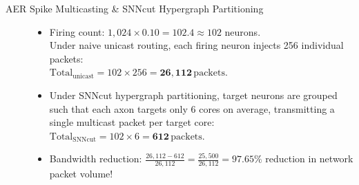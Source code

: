 \begin{description}
    \item[AER Spike Multicasting \& SNNcut Hypergraph Partitioning]
    \begin{itemize}
        \item Firing count: $1{,}024 \times 0.10 = 102.4 \approx 102$ neurons. \\
        Under naive unicast routing, each firing neuron injects 256 individual packets: \\
        $\mathrm{Total}_{\mathrm{unicast}} = 102 \times 256 = \mathbf{26{,}112\,\mathrm{packets}}$.
        \item Under SNNcut hypergraph partitioning, target neurons are grouped such that each axon targets only 6 cores on average, transmitting a single multicast packet per target core: \\
        $\mathrm{Total}_{\mathrm{SNNcut}} = 102 \times 6 = \mathbf{612\,\mathrm{packets}}$.
        \item Bandwidth reduction: $\frac{26{,}112 - 612}{26{,}112} = \frac{25{,}500}{26{,}112} = \mathbf{97.65\%}$ reduction in network packet volume!
    \end{itemize}
\end{description}
